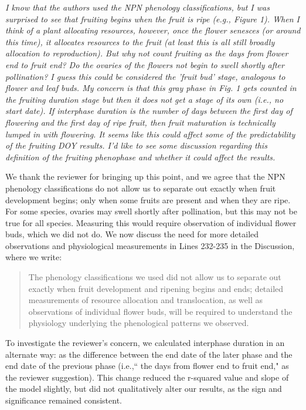 \documentclass[10.95pt,a4paper]{letter}
\begin{document}
\par \emph{I know that the authors used the NPN phenology classifications, but I was surprised to see that fruiting begins when the fruit is ripe (e.g., Figure 1). When I think of a plant allocating resources, however, once the flower senesces (or around this time), it allocates resources to the fruit (at least this is all still broadly allocation to reproduction).  But why not count fruiting as the days from flower end to fruit end? Do the ovaries of the flowers not begin to swell shortly after pollination? I guess this could be considered the 'fruit bud' stage, analogous to flower and leaf buds.  My concern is that this gray phase in Fig. 1 gets counted in the fruiting duration stage but then it does not get a stage of its own (i.e., no start date). If interphase duration is the number of days between the first day of flowering and the first day of ripe fruit, then fruit maturation is technically lumped in with flowering. It seems like this could affect some of the predictability of the fruiting DOY results. I'd like to see some discussion regarding this definition of the fruiting phenophase and whether it could affect the results.}  
\par We thank the reviewer for bringing up this point, and we agree that the NPN phenology classifications do not allow us to separate out exactly when fruit development begins; only when some fruits are present and when they are ripe. For some species, ovaries may swell shortly after pollination, but this may not be true for all species. Measuring this would require observation of individual flower buds, which we did not do. We now discuss the need for more detailed observations and  physiological measurements in Lines 232-235 in the Discussion, where we write:
\begin{quote}
The phenology classifications we used did not allow us to separate out exactly when fruit development and ripening begins and ends; detailed measurements of resource allocation and translocation, as well as observations of individual flower buds, will be required to understand the physiology underlying the phenological patterns we observed.
\end{quote}
\par To investigate the reviewer's concern, we calculated interphase duration in an alternate way: as the difference between the end date of the later phase and the end date of the previous phase (i.e.,`` the days from flower end to fruit end," as the reviewer suggestion). This change reduced the r-squared value and slope of the model slightly, but did not qualitatively alter our results, as the sign and significance remained consistent. 
\end{document}
